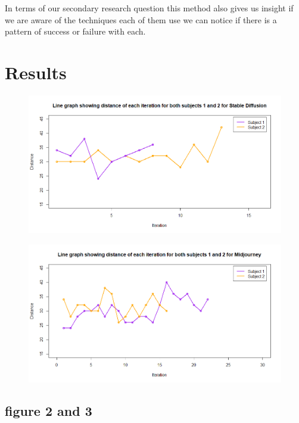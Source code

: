 \documentclass[]{report}
\begin{document}
	In terms of our secondary research question this method also gives us insight if we are aware of the techniques each of them use we can notice if there is a pattern of success or failure with each.
	
	\pagebreak
	
	\section{Results}
    
	\begin{figure}[!!htbp]
		\centering
		\includegraphics[width=1\linewidth]{LineGraphStableDiff}
		\caption{}
		\label{fig:linegraphstablediff}
	\end{figure}

\begin{figure}[!htbp]
	\centering
	\includegraphics[width=1\linewidth]{LineGraphMidJ}
	\caption{}
	\label{fig:linegraphmidj}
\end{figure}

\subsection{figure 2 and 3}
\end{document}

